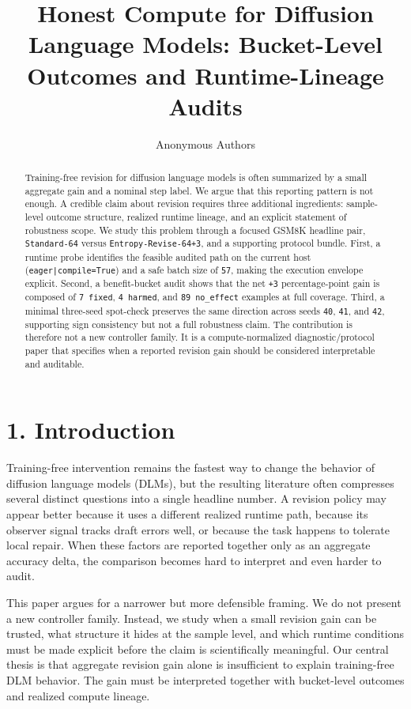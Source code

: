 \documentclass{article}
\title{Honest Compute for Diffusion Language Models: Bucket-Level Outcomes and Runtime-Lineage Audits}
\author{Anonymous Authors}
\begin{document}
\maketitle

\begin{abstract}
Training-free revision for diffusion language models is often summarized by a small aggregate gain and a nominal step label. We argue that this reporting pattern is not enough. A credible claim about revision requires three additional ingredients: sample-level outcome structure, realized runtime lineage, and an explicit statement of robustness scope. We study this problem through a focused GSM8K headline pair, \texttt{Standard-64} versus \texttt{Entropy-Revise-64+3}, and a supporting protocol bundle. First, a runtime probe identifies the feasible audited path on the current host (\texttt{eager|compile=True}) and a safe batch size of \texttt{57}, making the execution envelope explicit. Second, a benefit-bucket audit shows that the net \texttt{+3} percentage-point gain is composed of \texttt{7 fixed}, \texttt{4 harmed}, and \texttt{89 no\_effect} examples at full coverage. Third, a minimal three-seed spot-check preserves the same direction across seeds \texttt{40}, \texttt{41}, and \texttt{42}, supporting sign consistency but not a full robustness claim. The contribution is therefore not a new controller family. It is a compute-normalized diagnostic/protocol paper that specifies when a reported revision gain should be considered interpretable and auditable.
\end{abstract}

\section{1. Introduction}

Training-free intervention remains the fastest way to change the behavior of diffusion language models (DLMs), but the resulting literature often compresses several distinct questions into a single headline number. A revision policy may appear better because it uses a different realized runtime path, because its observer signal tracks draft errors well, or because the task happens to tolerate local repair. When these factors are reported together only as an aggregate accuracy delta, the comparison becomes hard to interpret and even harder to audit.

This paper argues for a narrower but more defensible framing. We do not present a new controller family. Instead, we study when a small revision gain can be trusted, what structure it hides at the sample level, and which runtime conditions must be made explicit before the claim is scientifically meaningful. Our central thesis is that aggregate revision gain alone is insufficient to explain training-free DLM behavior. The gain must be interpreted together with bucket-level outcomes and realized compute lineage.
\end{document}
